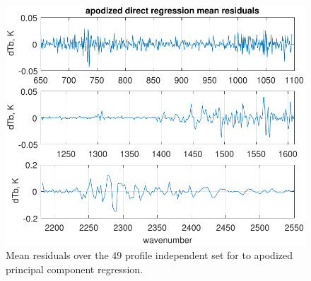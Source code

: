 \documentclass[journal]{IEEEtran}
\begin{document}

\begin{figure} %
  \centering
  \includegraphics[width=\linewidth]{figures/ap_pc_regr.pdf}
  \caption{Mean residuals over the 49 profile independent set for
    {\airs} to apodized {\cris} principal component regression.}
  \label{dreg6}
\end{figure}
\end{document}
